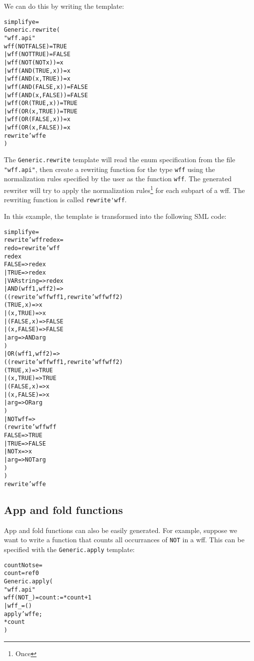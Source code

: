 We can do this by writing the template:
\begin{alltt}
   \FUN simplify e = 
       Generic.rewrite(
       \LET \INCLUDE "wff.api"
           \FUN wff (NOT FALSE) = TRUE
             | wff (NOT TRUE) = FALSE
             | wff (NOT(NOT x)) = x
             | wff (AND(TRUE,x)) = x
             | wff (AND(x,TRUE)) = x
             | wff (AND(FALSE,x)) = FALSE
             | wff (AND(x,FALSE)) = FALSE
             | wff (OR(TRUE,x)) = TRUE
             | wff (OR(x,TRUE)) = TRUE
             | wff (OR(FALSE,x)) = x
             | wff (OR(x,FALSE)) = x
       \IN  rewrite'wff e
       \END)
\end{alltt}
The \verb|Generic.rewrite| 
template will read the enum specification from the
file \verb|"wff.api"|,
then create a rewriting function for the type \verb|wff| using the
normalization rules specified by the user as the function \verb|wff|.  
The generated rewriter 
will try to apply the normalization rules\footnote{Once} for each
subpart of a wff.  The rewriting function
is called \verb|rewrite'wff|.

In this example, the template is transformed into the following SML code:
\begin{alltt}
  \FUN simplify e = 
  \LET \FUN rewrite'wff redex = 
      \LET \MY redo = rewrite'wff
      \IN  \CASE redex \OF
             FALSE => redex
           | TRUE => redex
           | VAR string => redex
           | AND(wff1, wff2) => 
             (\CASE (rewrite'wff wff1, rewrite'wff wff2) \OF
               (TRUE, x) => x
             | (x, TRUE) => x
             | (FALSE, x) => FALSE
             | (x, FALSE) => FALSE
             | arg => AND arg
             )
           | OR(wff1, wff2) => 
             (\CASE (rewrite'wff wff1, rewrite'wff wff2) \OF
               (TRUE, x) => TRUE
             | (x, TRUE) => TRUE
             | (FALSE, x) => x
             | (x, FALSE) => x
             | arg => OR arg
             )
           | NOT wff => 
             (\CASE rewrite'wff wff \OF
               FALSE => TRUE
             | TRUE => FALSE
             | NOT x => x
             | arg => NOT arg
             )
           )
        \END
   \IN rewrite'wff e
   \END
\end{alltt}
\subsection{App and fold functions}

 App and fold functions can also be easily generated.
For example, suppose we want to write a function that counts all occurrances
of \verb|NOT| in a wff.  This can be specified with the
\verb|Generic.apply| template:
\begin{alltt}
   \FUN countNots e = 
   \LET \MY count = ref 0
   \IN  Generic.apply(
       \LET \INCLUDE "wff.api"
           \FUN wff (NOT _) = count := *count + 1
             | wff _ = ()
       \IN  apply'wff e;
           *count
       \END)
   \END 
\end{alltt}

